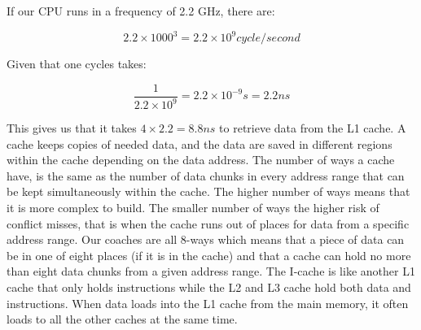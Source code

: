 If our CPU runs in a frequency of 2.2 GHz, there are:


$$ 2.2 \times 1000^3 = 2.2 \times 10^9 cycle / second$$

Given that one cycles takes:

$$ \frac{1}{2.2 \times 10^9 } = 2.2 \times 10^{-9}s = 2.2ns$$

This gives us that it takes $4 \times 2.2 = 8.8ns$ to retrieve data from the L1 cache. A cache keeps copies of needed data, and the data are saved in different regions
within the cache depending on the data address. The number of ways a cache have,
is the same as the number of data chunks in every address range that can be kept
simultaneously within the cache. The higher number of ways means that it is more
complex to build. The smaller number of ways the higher risk of conflict misses, that
is when the cache runs out of places for data from a specific address range. Our
coaches are all 8-ways which means that a piece of data can be in one of eight places
(if it is in the cache) and that a cache can hold no more than eight data chunks from a
given address range. The I-cache is like another L1 cache that only holds instructions
while the L2 and L3 cache hold both data and instructions. When data loads into
the L1 cache from the main memory, it often loads to all the other caches at the same
time.


